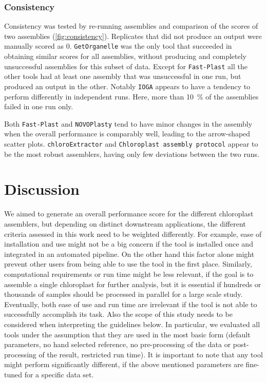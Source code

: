 \documentclass{bmcart}
\newcounter{todocounter}
\newcommand{\ak}[1]
{\stepcounter{todocounter}
 \todo[color=green!40,author=Arthur]{\thetodocounter: #1}
 }
\newcommand{\formatprogramnames}[1]{\texttt{#1}}
\newcommand{\ce}{\formatprogramnames{chloroExtractor}}
\newcommand{\fp}{\formatprogramnames{Fast-Plast}}
\newcommand{\ioga}{\formatprogramnames{IOGA}}
\newcommand{\np}{\formatprogramnames{NOVOPlasty}}
\newcommand{\go}{\formatprogramnames{GetOrganelle}}
\newcommand{\cassp}{\formatprogramnames{Chloroplast assembly protocol}}
\begin{document}
\subsubsection*{Consistency}
Consistency was tested by re-running assemblies and comparison of the scores of two assemblies (\cref{fig:consistency}).
Replicates that did not produce an output were manually scored as \num{0}. 
\go{} was the only tool that succeeded in obtaining similar scores for all assemblies, without producing and completely unsuccessful assemblies for this subset of data.
Except for \fp{} all the other tools had at least one assembly that was unsuccessful in one run, but produced an output in the other.
Notably \ioga{} appears to have a tendency to perform differently in independent runs.
Here, more than \SI{10}{\percent} of the assemblies failed in one run only.

Both \fp{} and \np{} tend to have minor changes in the assembly when the overall performance is comparably well, leading to the arrow-shaped scatter plots.
\ce{} and \cassp{} appear to be the most robust assemblers, having only few deviations between the two runs.

\section*{Discussion}
We aimed to generate an overall performance score for the different chloroplast assemblers, but depending on distinct downstream applications, the different criteria assessed in this work need to be weighted differently.
For example, ease of installation and use might not be a big concern if the tool is installed once and integrated in an automated pipeline. On the other hand this factor alone might prevent other users from being able to use the tool in the first place.
Similarly, computational requirements or run time might be less relevant, if the goal is to assemble a single chloroplast for further analysis, but it is essential if hundreds or thousands of samples should be processed in parallel for a large scale study.
Eventually, both ease of use and run time are irrelevant if the tool is not able to successfully accomplish its task.
Also the scope of this study needs to be considered when interpreting the guidelines below.
In particular, we evaluated all tools under the assumption that they are used in the most basic form (default parameters, no hand selected reference, no pre-processing of the data or post-processing of the result, restricted run time).
It is important to note that any tool might perform significantly different, if the above mentioned parameters are fine-tuned for a specific data set.
\end{document}
